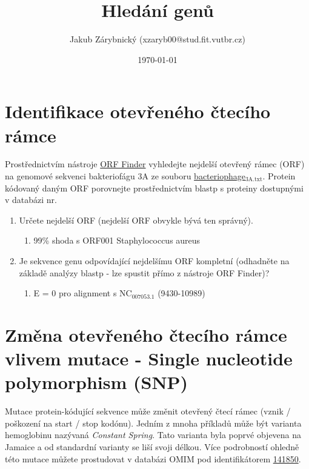 \documentclass[11pt]{article}
\author{Jakub Zárybnický (xzaryb00@stud.fit.vutbr.cz)}
\date{\today}
\title{Hledání genů}
\begin{document}
\maketitle

\section{Identifikace otevřeného čtecího rámce}
\label{sec:orgbdffc33}
Prostřednictvím nástroje \href{https://www.ncbi.nlm.nih.gov/orffinder/}{ORF Finder} vyhledejte nejdelší otevřený rámec (ORF) na
genomové sekvenci bakteriofágu 3A ze souboru \href{./bacteriophage\_3A.txt}{bacteriophage\(_{\text{3A.txt}}\)}. Protein
kódovaný daným ORF porovnejte prostřednictvím blastp s proteiny dostupnými v
databázi nr.

\begin{enumerate}
\item Určete nejdelší ORF (nejdelší ORF obvykle bývá ten správný).
\begin{enumerate}
\item 99\% shoda s ORF001 Staphylococcus aureus
\end{enumerate}
\item Je sekvence genu odpovídající nejdelšímu ORF kompletní (odhadněte na základě
analýzy blastp - lze spustit přímo z nástroje ORF Finder)?
\begin{enumerate}
\item E = 0 pro alignment s NC\(_{\text{007053.1}}\) (9430-10989)
\end{enumerate}
\end{enumerate}

\section{Změna otevřeného čtecího rámce vlivem mutace - Single nucleotide polymorphism (SNP)}
\label{sec:orga5153e3}
Mutace protein-kódující sekvence může změnit otevřený čtecí rámec (vznik /
poškození na start / stop kodónu). Jedním z mnoha příkladů může být varianta
hemoglobinu nazývaná \emph{Constant Spring}. Tato varianta byla poprvé objevena na
Jamaice a od standardní varianty se liší svoji délkou. Více podrobností ohledně
této mutace můžete prostudovat v databázi OMIM pod identifikátorem \href{http://omim.org/entry/141850}{141850}.
\end{document}
